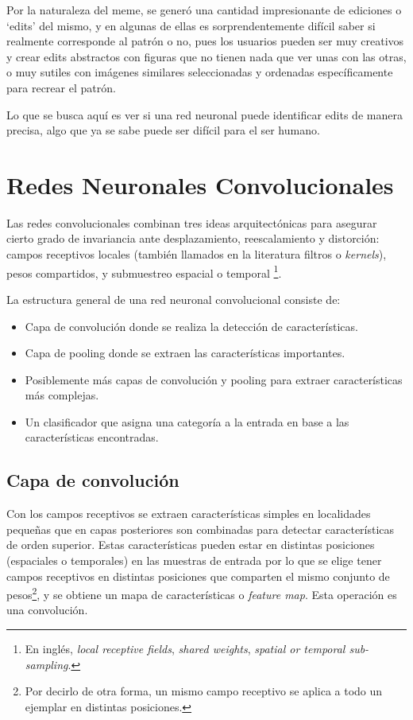 \documentclass[spanish,11pt,letterpaper]{article}
\begin{document}
Por la naturaleza del meme, se generó una cantidad impresionante de ediciones o `edits' del mismo,
y en algunas de ellas es sorprendentemente difícil saber si realmente corresponde al patrón o no, pues
los usuarios pueden ser muy creativos y crear edits abstractos con figuras
que no tienen nada que ver unas con las otras, o muy sutiles con imágenes similares seleccionadas y
ordenadas específicamente para recrear el patrón.

Lo que se busca aquí es ver si una red neuronal puede identificar edits de manera precisa, algo que
ya se sabe puede ser difícil para el ser humano.


\section{Redes Neuronales Convolucionales\cite{lecun}}

Las redes convolucionales combinan tres ideas arquitectónicas para asegurar cierto
grado de invariancia ante desplazamiento, reescalamiento y distorción: campos
receptivos locales (también llamados en la literatura filtros o \textit{kernels}),
pesos compartidos, y submuestreo espacial o temporal%
\footnote{En inglés, \textit{local receptive fields}, \textit{shared weights},
\textit{spatial or temporal sub-sampling}.}.

La estructura general de una red neuronal convolucional consiste de:
\begin{itemize}
  \item Capa de convolución donde se realiza la detección de características.
  \item Capa de pooling donde se extraen las características importantes.
  \item Posiblemente más capas de convolución y pooling para extraer características
  más complejas.
  \item Un clasificador que asigna una categoría a la entrada en base a las
  características encontradas.
\end{itemize}

\subsection{Capa de convolución}

Con los campos receptivos se extraen características simples en localidades
pequeñas que en capas posteriores
son combinadas para detectar características de orden superior. Estas características
pueden estar en distintas posiciones (espaciales o temporales) en las muestras
de entrada por lo que se elige tener campos receptivos en distintas posiciones
que comparten el mismo conjunto de pesos\footnote{Por decirlo de otra forma, un
mismo campo receptivo se aplica a todo un ejemplar en distintas posiciones.}, y
se obtiene un mapa de características o \textit{feature map}. Esta operación es
una convolución.
\end{document}
